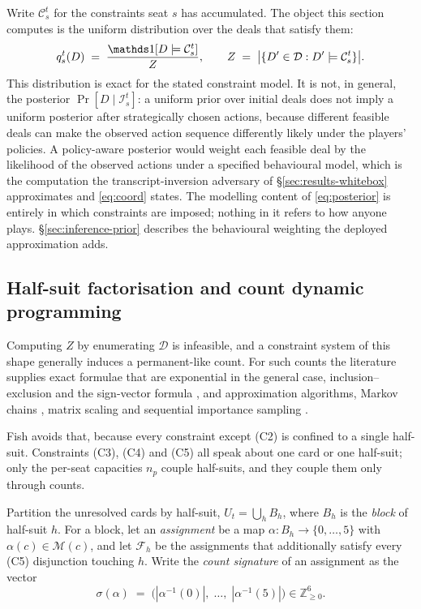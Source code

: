 Write $\mathcal{C}_s^t$ for the constraints seat $s$ has accumulated. The object this section
computes is the uniform distribution over the deals that satisfy them:
\begin{equation}
  q_s^t(D) \;=\; \frac{\ind\!\left[D \models \mathcal{C}_s^t\right]}{Z},
  \qquad
  Z \;=\; \bigl|\{D' \in \mathcal{D} : D' \models \mathcal{C}_s^t\}\bigr|.
  \label{eq:posterior}
\end{equation}
This distribution is exact for the stated constraint model. It is not, in general, the posterior
$\Pr[D \mid \mathcal{I}_s^t]$: a uniform prior over initial deals does not imply a uniform posterior
after strategically chosen actions, because different feasible deals can make the observed action
sequence differently likely under the players' policies. A policy-aware posterior would weight each
feasible deal by the likelihood of the observed actions under a specified behavioural model, which
is the computation the transcript-inversion adversary of \S\ref{sec:results-whitebox} approximates
and \eqref{eq:coord} states. The modelling content of \eqref{eq:posterior} is entirely in which
constraints are imposed; nothing in it refers to how anyone plays. \S\ref{sec:inference-prior}
describes the behavioural weighting the deployed approximation adds.

\subsection{Half-suit factorisation and count dynamic programming}
\label{sec:inference-factor}

Computing $Z$ by enumerating $\mathcal{D}$ is infeasible, and a constraint system of this shape
generally induces a permanent-like count. For such counts the literature supplies exact formulae
that are exponential in the general case, inclusion--exclusion \cite{ryser} and the sign-vector
formula \cite{glynn}, and approximation algorithms, Markov chains \cite{jsv}, matrix scaling
\cite{lsw} and sequential importance sampling \cite{chen-sis}.

Fish avoids that, because every constraint except (C2) is confined to a single half-suit. Constraints
(C3), (C4) and (C5) all speak about one card or one half-suit; only the per-seat capacities $n_p$
couple half-suits, and they couple them only through counts.

Partition the unresolved cards by half-suit, $U_t = \bigcup_{h} B_h$, where $B_h$ is the
\emph{block} of half-suit $h$. For a block, let an \emph{assignment} be a map $\alpha: B_h \to
\{0,\dots,5\}$ with $\alpha(c) \in \mathcal{M}(c)$, and let $\mathcal{F}_h$ be the assignments that
additionally satisfy every (C5) disjunction touching $h$. Write the \emph{count signature} of an
assignment as the vector
\[
  \sigma(\alpha) \;=\; \bigl(|\alpha^{-1}(0)|,\;\dots,\;|\alpha^{-1}(5)|\bigr) \in \mathbb{Z}_{\ge 0}^{6}.
\]

